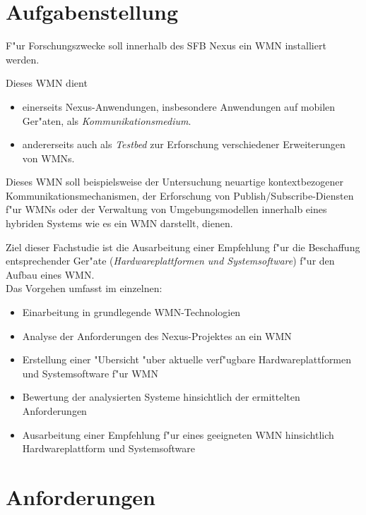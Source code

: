 \section{Aufgabenstellung}

F"ur Forschungszwecke soll innerhalb des SFB Nexus \cite{nexus}
ein WMN installiert werden. 

Dieses WMN dient 
\begin{itemize}
	\item einerseits Nexus-Anwendungen, insbesondere Anwendungen 
	auf mobilen Ger"aten, als \emph{Kommunikationsmedium}. 

	\item andererseits auch als \emph{Testbed} 
	zur Erforschung verschiedener Erweiterungen von WMNs.
\end{itemize}

Dieses WMN soll beispielsweise der Untersuchung neuartige kontextbezogener 
Kommunikationsmechanismen, der Erforschung von 
Publish/Subscribe-Diensten f"ur WMNs oder der 
Verwaltung von Umgebungsmodellen innerhalb eines 
hybriden Systems wie es ein WMN darstellt, dienen.

Ziel dieser Fachstudie ist die Ausarbeitung einer 
Empfehlung f"ur die Beschaffung entsprechender Ger"ate 
(\emph{Hardwareplattformen und Systemsoftware}) f"ur
den Aufbau eines WMN. \\

Das Vorgehen umfasst im einzelnen:

\begin{itemize}
	
	\item Einarbeitung in grundlegende WMN-Technologien
	\item Analyse der Anforderungen des Nexus-Projektes an ein WMN
	\item Erstellung einer "Ubersicht "uber aktuelle verf"ugbare 
	Hardwareplattformen und Systemsoftware f"ur WMN
	\item Bewertung der analysierten Systeme hinsichtlich 
	der ermittelten Anforderungen 	
	\item Ausarbeitung einer Empfehlung f"ur eines geeigneten 
	WMN hinsichtlich Hardwareplattform und Systemsoftware
	
\end{itemize}


\section{Anforderungen}

